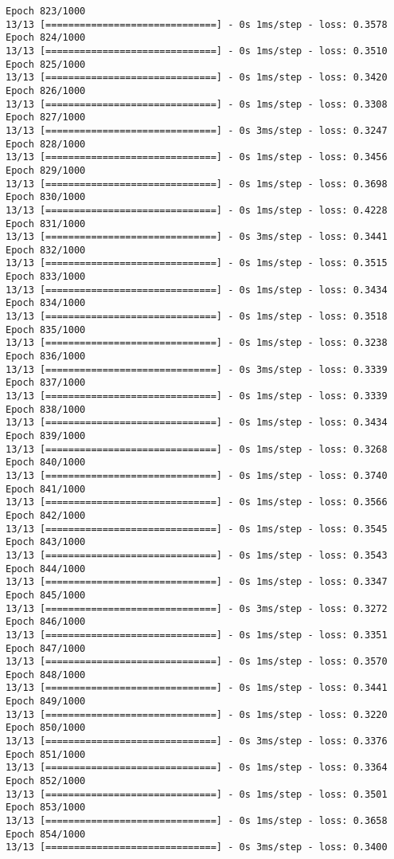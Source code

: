 \documentclass[11pt]{article}
\begin{document}
\begin{Verbatim}[commandchars=\\\{\}]
Epoch 823/1000
13/13 [==============================] - 0s 1ms/step - loss: 0.3578
Epoch 824/1000
13/13 [==============================] - 0s 1ms/step - loss: 0.3510
Epoch 825/1000
13/13 [==============================] - 0s 1ms/step - loss: 0.3420
Epoch 826/1000
13/13 [==============================] - 0s 1ms/step - loss: 0.3308
Epoch 827/1000
13/13 [==============================] - 0s 3ms/step - loss: 0.3247
Epoch 828/1000
13/13 [==============================] - 0s 1ms/step - loss: 0.3456
Epoch 829/1000
13/13 [==============================] - 0s 1ms/step - loss: 0.3698
Epoch 830/1000
13/13 [==============================] - 0s 1ms/step - loss: 0.4228
Epoch 831/1000
13/13 [==============================] - 0s 3ms/step - loss: 0.3441
Epoch 832/1000
13/13 [==============================] - 0s 1ms/step - loss: 0.3515
Epoch 833/1000
13/13 [==============================] - 0s 1ms/step - loss: 0.3434
Epoch 834/1000
13/13 [==============================] - 0s 1ms/step - loss: 0.3518
Epoch 835/1000
13/13 [==============================] - 0s 1ms/step - loss: 0.3238
Epoch 836/1000
13/13 [==============================] - 0s 3ms/step - loss: 0.3339
Epoch 837/1000
13/13 [==============================] - 0s 1ms/step - loss: 0.3339
Epoch 838/1000
13/13 [==============================] - 0s 1ms/step - loss: 0.3434
Epoch 839/1000
13/13 [==============================] - 0s 1ms/step - loss: 0.3268
Epoch 840/1000
13/13 [==============================] - 0s 1ms/step - loss: 0.3740
Epoch 841/1000
13/13 [==============================] - 0s 1ms/step - loss: 0.3566
Epoch 842/1000
13/13 [==============================] - 0s 1ms/step - loss: 0.3545
Epoch 843/1000
13/13 [==============================] - 0s 1ms/step - loss: 0.3543
Epoch 844/1000
13/13 [==============================] - 0s 1ms/step - loss: 0.3347
Epoch 845/1000
13/13 [==============================] - 0s 3ms/step - loss: 0.3272
Epoch 846/1000
13/13 [==============================] - 0s 1ms/step - loss: 0.3351
Epoch 847/1000
13/13 [==============================] - 0s 1ms/step - loss: 0.3570
Epoch 848/1000
13/13 [==============================] - 0s 1ms/step - loss: 0.3441
Epoch 849/1000
13/13 [==============================] - 0s 1ms/step - loss: 0.3220
Epoch 850/1000
13/13 [==============================] - 0s 3ms/step - loss: 0.3376
Epoch 851/1000
13/13 [==============================] - 0s 1ms/step - loss: 0.3364
Epoch 852/1000
13/13 [==============================] - 0s 1ms/step - loss: 0.3501
Epoch 853/1000
13/13 [==============================] - 0s 1ms/step - loss: 0.3658
Epoch 854/1000
13/13 [==============================] - 0s 3ms/step - loss: 0.3400

\end{Verbatim}
\end{document}
